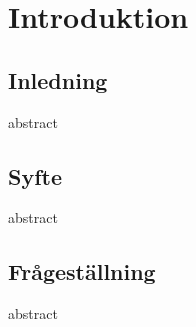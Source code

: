 \chapter{Introduktion}

\section{Inledning}
abstract
\section{Syfte}
abstract
\section{Frågeställning}
abstract